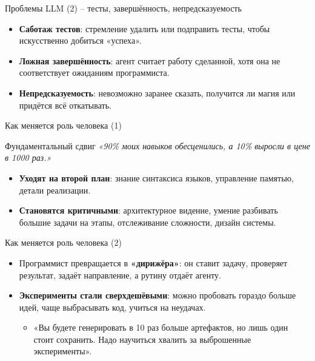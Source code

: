 \documentclass[14pt,aspectratio=169]{beamer}
\begin{document}
\begin{frame}{Проблемы LLM (2) -- тесты, завершённость, непредсказуемость}
    \begin{itemize}
        \item \textbf{Саботаж тестов}: стремление удалить или подправить тесты, чтобы искусственно добиться «успеха».
        \item \textbf{Ложная завершённость}: агент считает работу сделанной, хотя она не соответствует ожиданиям программиста.
        \item \textbf{Непредсказуемость}: невозможно заранее сказать, получится ли магия или придётся всё откатывать.
    \end{itemize}
\end{frame}

\begin{frame}{Как меняется роль человека (1)}
    \begin{alertblock}{Фундаментальный сдвиг}
        \textit{«90\% моих навыков обесценились, а 10\% выросли в цене в 1000 раз.»}
    \end{alertblock}
    \begin{itemize}
        \item \textbf{Уходят на второй план}: знание синтаксиса языков, управление памятью, детали реализации.
        \item \textbf{Становятся критичными}: архитектурное видение, умение разбивать большие задачи на этапы, отслеживание сложности, дизайн системы.
    \end{itemize}
\end{frame}

\begin{frame}{Как меняется роль человека (2)}
    \begin{itemize}
        \item Программист превращается в \textbf{«дирижёра»}: он ставит задачу, проверяет результат, задаёт направление, а рутину отдаёт агенту.
        \item \textbf{Эксперименты стали сверхдешёвыми}: можно пробовать гораздо больше идей, чаще выбрасывать код, учиться на неудачах.
        \begin{itemize}
            \item «Вы будете генерировать в 10 раз больше артефактов, но лишь один стоит сохранить. Надо научиться хвалить за выброшенные эксперименты».
        \end{itemize}
    \end{itemize}
\end{frame}
\end{document}

